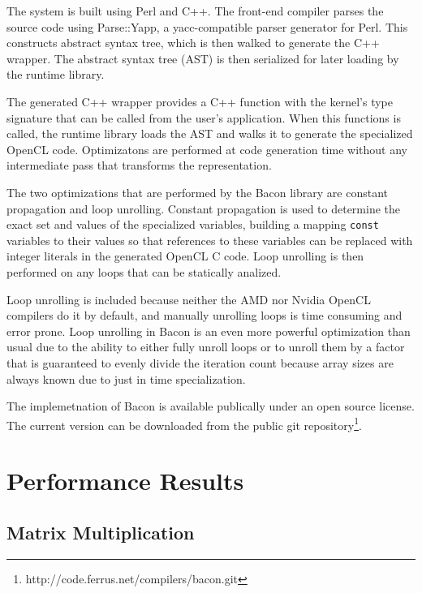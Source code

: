 \documentclass{llncs}
\begin{document}
The system is built using Perl and C++. The front-end compiler parses
the source code using Parse::Yapp\cite{parse::yapp}, a yacc-compatible
parser generator for Perl. This constructs abstract syntax tree, which
is then walked to generate the C++ wrapper. The abstract syntax tree
(AST) is then serialized for later loading by the runtime library.

The generated C++ wrapper provides a C++ function with the kernel's
type signature that can be called from the user's application. When
this functions is called, the runtime library loads the AST and walks
it to generate the specialized OpenCL code. Optimizatons are performed
at code generation time without any intermediate pass that transforms
the representation.

The two optimizations that are performed by the Bacon library are
constant propagation and loop unrolling. Constant propagation is used
to determine the exact set and values of the specialized variables,
building a mapping {\tt const} variables to their values so that
references to these variables can be replaced with integer literals in
the generated OpenCL C code. Loop unrolling is then performed on any
loops that can be statically analized.

Loop unrolling is included because neither the AMD nor Nvidia OpenCL
compilers do it by default, and manually unrolling loops is time
consuming and error prone. Loop unrolling in Bacon is an even more
powerful optimization than usual due to the ability to either fully
unroll loops or to unroll them by a factor that is guaranteed to
evenly divide the iteration count because array sizes are always known
due to just in time specialization.

The implemetnation of Bacon is available publically under an open
source license. The current version can be downloaded from the public
git repository\footnote{http://code.ferrus.net/compilers/bacon.git}.

\section{Performance Results}

\subsection{Matrix Multiplication}
\end{document}
